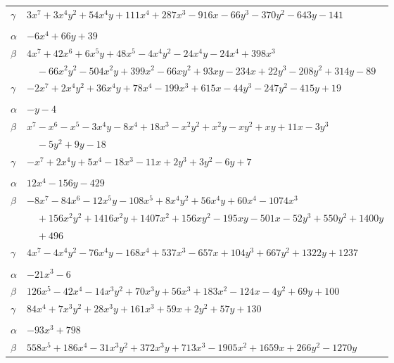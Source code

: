 \documentclass[11pt]{article}
\begin{document}
\begin{longtable}{@{}ll@{}}
$\gamma$ & $3x^{7}+3x^{4}y^{2}+54x^{4}y+111x^{4}+287x^{3}-916x-66y^{3}-370y^{2}-643y-141$\\
\addlinespace[3pt]
\multicolumn{2}{@{}l}{$\{i,j\}=\{46,56\}$, $k_{ij}=2\cdot 3^{2}\cdot 11$}\\
$\alpha$ & $-6x^{4}+66y+39$\\
$\beta$ & $4x^{7}+42x^{6}+6x^{5}y+48x^{5}-4x^{4}y^{2}-24x^{4}y-24x^{4}+398x^{3}$\\
 & $\quad -66x^{2}y^{2}-504x^{2}y+399x^{2}-66xy^{2}+93xy-234x+22y^{3}-208y^{2}+314y-89$\\
$\gamma$ & $-2x^{7}+2x^{4}y^{2}+36x^{4}y+78x^{4}-199x^{3}+615x-44y^{3}-247y^{2}-415y+19$\\
\addlinespace[3pt]
\multicolumn{2}{@{}l}{$\{i,j\}=\{46,66\}$, $k_{ij}=2\cdot 3^{2}$}\\
$\alpha$ & $-y-4$\\
$\beta$ & $x^{7}-x^{6}-x^{5}-3x^{4}y-8x^{4}+18x^{3}-x^{2}y^{2}+x^{2}y-xy^{2}+xy+11x-3y^{3}$\\
 & $\quad -5y^{2}+9y-18$\\
$\gamma$ & $-x^{7}+2x^{4}y+5x^{4}-18x^{3}-11x+2y^{3}+3y^{2}-6y+7$\\
\addlinespace[3pt]
\multicolumn{2}{@{}l}{$\{i,j\}=\{46,74\}$, $k_{ij}=3^{4}\cdot 13$}\\
$\alpha$ & $12x^{4}-156y-429$\\
$\beta$ & $-8x^{7}-84x^{6}-12x^{5}y-108x^{5}+8x^{4}y^{2}+56x^{4}y+60x^{4}-1074x^{3}$\\
 & $\quad +156x^{2}y^{2}+1416x^{2}y+1407x^{2}+156xy^{2}-195xy-501x-52y^{3}+550y^{2}+1400y$\\
 & $\quad +496$\\
$\gamma$ & $4x^{7}-4x^{4}y^{2}-76x^{4}y-168x^{4}+537x^{3}-657x+104y^{3}+667y^{2}+1322y+1237$\\
\addlinespace[3pt]
\multicolumn{2}{@{}l}{$\{i,j\}=\{46,80\}$, $k_{ij}=2\cdot 3^{3}$}\\
$\alpha$ & $-21x^{3}-6$\\
$\beta$ & $126x^{5}-42x^{4}-14x^{3}y^{2}+70x^{3}y+56x^{3}+183x^{2}-124x-4y^{2}+69y+100$\\
$\gamma$ & $84x^{4}+7x^{3}y^{2}+28x^{3}y+161x^{3}+59x+2y^{2}+57y+130$\\
\addlinespace[3pt]
\multicolumn{2}{@{}l}{$\{i,j\}=\{46,101\}$, $k_{ij}=2\cdot 3^{5}\cdot 11$}\\
$\alpha$ & $-93x^{3}+798$\\
$\beta$ & $558x^{5}+186x^{4}-31x^{3}y^{2}+372x^{3}y+713x^{3}-1905x^{2}+1659x+266y^{2}-1270y$\\

\end{longtable}
\end{document}
